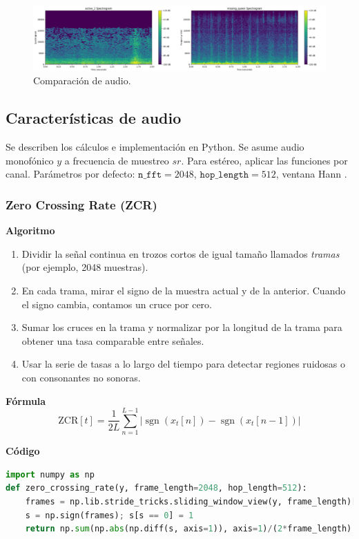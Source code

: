 \begin{figure}[!ht]
    \centering
    \includegraphics[width=\textwidth]{assets/cap_3/comparacion_audio.png}
    \caption{Comparación de audio.}
    \label{fig:comparacion_audio}
\end{figure}

\subsection{Características de audio}
Se describen los cálculos e implementación en Python. Se asume audio monofónico \(y\) a frecuencia de muestreo \(sr\). Para estéreo, aplicar las funciones por canal. Parámetros por defecto: \(\texttt{n\_fft}=2048\), \(\texttt{hop\_length}=512\), ventana Hann \parencite{mcfee2015librosa}.

\subsubsection{Zero Crossing Rate (ZCR)}
\textbf{Algoritmo} \parencite{rabiner2011tasdp, tzanetakis2002musical}
\begin{enumerate}
    \item Dividir la señal continua en trozos cortos de igual tamaño llamados \emph{tramas} (por ejemplo, 2048 muestras).
    \item En cada trama, mirar el signo de la muestra actual y de la anterior. Cuando el signo cambia, contamos un cruce por cero.
    \item Sumar los cruces en la trama y normalizar por la longitud de la trama para obtener una tasa comparable entre señales.
    \item Usar la serie de tasas a lo largo del tiempo para detectar regiones ruidosas o con consonantes no sonoras.
\end{enumerate}

\textbf{Fórmula}
\[
\text{ZCR}[t]=\frac{1}{2L}\sum_{n=1}^{L-1}\big|\operatorname{sgn}(x_t[n])-\operatorname{sgn}(x_t[n-1])\big|
\]

\textbf{Código}
\begin{lstlisting}[language=Python, label={lst:zcr_code}, caption={ZCR por tramas}]
import numpy as np
def zero_crossing_rate(y, frame_length=2048, hop_length=512):
    frames = np.lib.stride_tricks.sliding_window_view(y, frame_length)[::hop_length]
    s = np.sign(frames); s[s == 0] = 1
    return np.sum(np.abs(np.diff(s, axis=1)), axis=1)/(2*frame_length)
\end{lstlisting}

